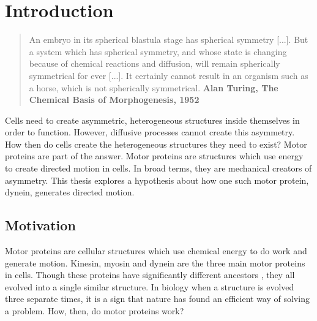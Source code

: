 \documentclass[
11pt, %
english, %
singlespacing, %
headsepline, %
chapterinoneline, %
]{MastersDoctoralThesis} %
\begin{document}


\mainmatter %

\pagestyle{thesis} %


\chapter{Introduction}
\label{chap:Introduction}

\blockquote{An embryo in its spherical blastula stage has spherical symmetry [...]. But a system which has spherical symmetry, and whose state is changing because of chemical reactions and diffusion, will remain spherically symmetrical for ever [...]. It certainly cannot result in an organism such as a horse, which is not spherically symmetrical. \textbf{Alan Turing, The Chemical Basis of Morphogenesis, 1952}}

Cells need to create asymmetric, heterogeneous structures inside themselves in order to function. However, diffusive processes cannot create this asymmetry. How then do cells create the heterogeneous structures they need to exist? Motor proteins are part of the answer. Motor proteins are structures which use energy to create directed motion in cells. In broad terms, they are mechanical creators of asymmetry. This thesis explores a hypothesis about how one such motor protein, dynein, generates directed motion.\\

\section{Motivation}
Motor proteins are cellular structures which use chemical energy to do work and generate motion. Kinesin, myosin and dynein are the three main motor proteins in cells. Though these proteins have significantly different ancestors \cite{hook-family}, they all evolved into a single similar structure. In biology when a structure is evolved three separate times, it is a sign that nature has found an efficient way of solving a problem. How, then, do motor proteins work?\\
\end{document}
